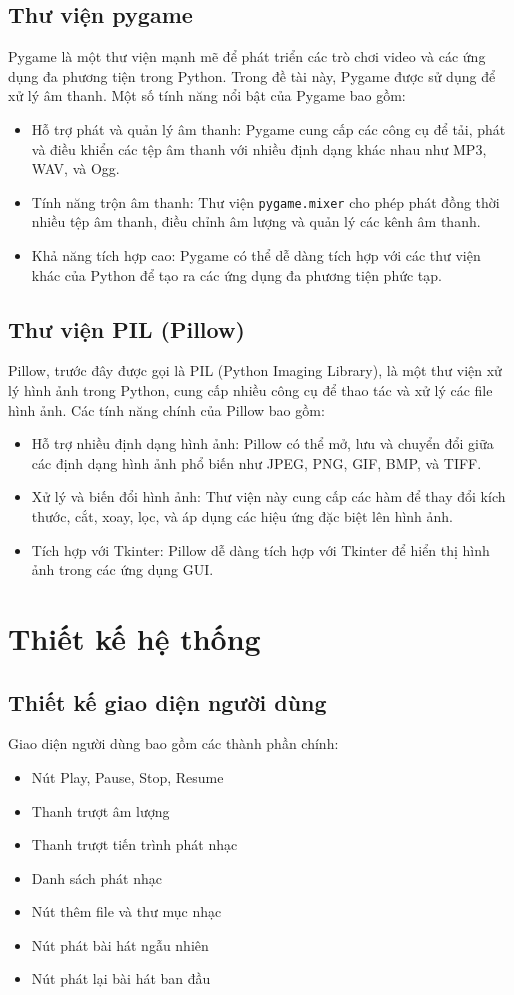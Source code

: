\documentclass[a4paper]{article}
\begin{document}
\subsection{Thư viện pygame}
Pygame là một thư viện mạnh mẽ để phát triển các trò chơi video và các ứng dụng đa phương tiện trong Python. Trong đề tài này, Pygame được sử dụng để xử lý âm thanh. Một số tính năng nổi bật của Pygame bao gồm:
\begin{itemize}
    \item Hỗ trợ phát và quản lý âm thanh: Pygame cung cấp các công cụ để tải, phát và điều khiển các tệp âm thanh với nhiều định dạng khác nhau như MP3, WAV, và Ogg.
    \item Tính năng trộn âm thanh: Thư viện \texttt{pygame.mixer} cho phép phát đồng thời nhiều tệp âm thanh, điều chỉnh âm lượng và quản lý các kênh âm thanh.
    \item Khả năng tích hợp cao: Pygame có thể dễ dàng tích hợp với các thư viện khác của Python để tạo ra các ứng dụng đa phương tiện phức tạp.
\end{itemize}

\subsection{Thư viện PIL (Pillow)}
Pillow, trước đây được gọi là PIL (Python Imaging Library), là một thư viện xử lý hình ảnh trong Python, cung cấp nhiều công cụ để thao tác và xử lý các file hình ảnh. Các tính năng chính của Pillow bao gồm:
\begin{itemize}
    \item Hỗ trợ nhiều định dạng hình ảnh: Pillow có thể mở, lưu và chuyển đổi giữa các định dạng hình ảnh phổ biến như JPEG, PNG, GIF, BMP, và TIFF.
    \item Xử lý và biến đổi hình ảnh: Thư viện này cung cấp các hàm để thay đổi kích thước, cắt, xoay, lọc, và áp dụng các hiệu ứng đặc biệt lên hình ảnh.
    \item Tích hợp với Tkinter: Pillow dễ dàng tích hợp với Tkinter để hiển thị hình ảnh trong các ứng dụng GUI.
\end{itemize}

\section{Thiết kế hệ thống}
\subsection{Thiết kế giao diện người dùng}
Giao diện người dùng bao gồm các thành phần chính:
\begin{itemize}
    \item Nút Play, Pause, Stop, Resume
    \item Thanh trượt âm lượng
    \item Thanh trượt tiến trình phát nhạc
    \item Danh sách phát nhạc
    \item Nút thêm file và thư mục nhạc
    \item Nút phát bài hát ngẫu nhiên
    \item Nút phát lại bài hát ban đầu
\end{itemize}
\end{document}
